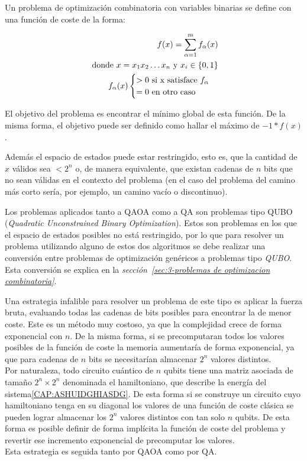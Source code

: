 Un problema de optimización combinatoria con variables binarias se define con una función de coste de la forma:

\begin{align}
  f(x) = \sum_{\alpha = 1}^{m} f_\alpha(x) \\
  \textnormal{ donde } x = x_1x_2 \ldots x_n \textnormal{ y } x_i\in{\{0, 1\}} \nonumber \\
   f_{\alpha}(x) \begin{cases} \nonumber
     > 0 \textnormal{ si x satisface } f_\alpha \\
     = 0 \textnormal{ en otro caso}
   \end{cases}
\end{align}

El objetivo del problema es encontrar el mínimo global de esta función. De la misma forma, el objetivo puede ser definido como hallar el máximo de $-1*f(x)$.

Además el espacio de estados puede estar restringido, esto es, que la cantidad de $x$ válidos sea $< 2^n$ o, de manera equivalente, que existan cadenas de $n$ bits que no sean válidas en el contexto del problema (en el caso del problema del camino más corto sería, por ejemplo, un camino vacío o discontinuo).

Los problemas aplicados tanto a QAOA como a QA son problemas tipo QUBO (\textit{Quadratic Unconstrained Binary Optimization}).
Estos son problemas en los que el espacio de estados posibles no está restringido, por lo que para resolver un problema utilizando alguno de estos dos algoritmos se debe realizar una conversión entre problemas de optimización genéricos a problemas tipo \textit{QUBO}. Esta conversión se explica en la \textit{sección~\ref{sec:3-problemas de optimizacion combinatoria}}.

Una estrategia infalible para resolver un problema de este tipo es aplicar la fuerza bruta, evaluando todas las cadenas de bits posibles para encontrar la de menor coste.
Este es un método muy costoso, ya que la complejidad crece de forma exponencial con $n$.
De la misma forma, si se precomputaran todos los valores posibles de la función de coste la memoria aumentaría de forma exponencial, ya que para cadenas de $n$ bits se necesitarían almacenar $2^n$ valores distintos.
\\
Por naturaleza, todo circuito cuántico de $n$ qubits tiene una matriz asociada de tamaño $2^n \times 2^n$ denominada el hamiltoniano, que describe la energía del sistema\ref{CAP:ASHUIDGHIASDG}.
De esta forma si se construye un circuito cuyo hamiltoniano tenga en su diagonal los valores de una función de coste clásica se pueden lograr almacenar los $2^n$ valores distintos con tan solo $n$ qubits.
De esta forma es posible definir de forma implícita la función de coste del problema y revertir ese incremento exponencial de precomputar los valores.
\\
Esta estrategia es seguida tanto por QAOA como por QA\@.


